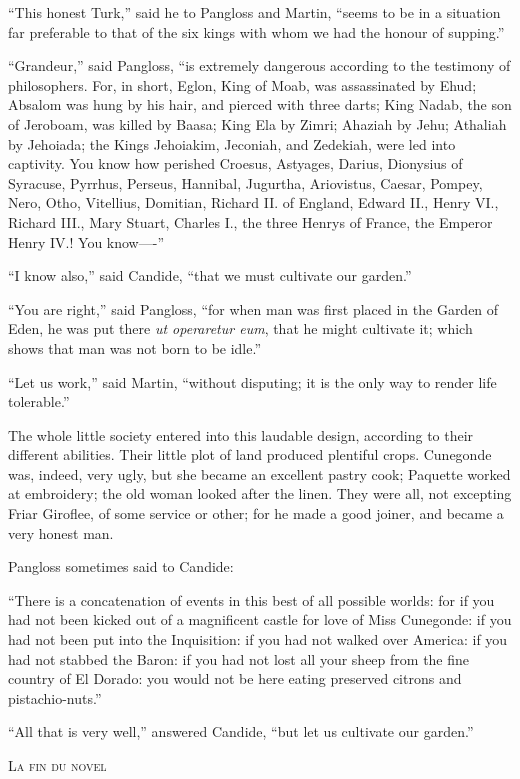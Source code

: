 ``This honest Turk,'' said he to Pangloss and Martin, ``seems to be in a situation far preferable to that of the six kings with whom we had the honour of supping.''

``Grandeur,'' said Pangloss, ``is extremely dangerous according to the testimony of philosophers. For, in short, Eglon, King of Moab, was assassinated by Ehud; Absalom was hung by his hair, and pierced with three darts; King Nadab, the son of Jeroboam, was killed by Baasa; King Ela by Zimri; Ahaziah by Jehu; Athaliah by Jehoiada; the Kings Jehoiakim, Jeconiah, and Zedekiah, were led into captivity. You know how perished Croesus, Astyages, Darius, Dionysius of Syracuse, Pyrrhus, Perseus, Hannibal, Jugurtha, Ariovistus, Caesar, Pompey, Nero, Otho, Vitellius, Domitian, Richard II. of England, Edward II., Henry VI., Richard III., Mary Stuart, Charles I., the three Henrys of France, the Emperor Henry IV.! You know----''

``I know also,'' said Candide, ``that we must cultivate our garden.''

``You are right,'' said Pangloss, ``for when man was first placed in the Garden of Eden, he was put there \textit{ut operaretur eum}, that he might cultivate it; which shows that man was not born to be idle.''

``Let us work,'' said Martin, ``without disputing; it is the only way to render life tolerable.''

The whole little society entered into this laudable design, according to their different abilities. Their little plot of land produced plentiful crops. Cunegonde was, indeed, very ugly, but she became an excellent pastry cook; Paquette worked at embroidery; the old woman looked after the linen. They were all, not excepting Friar Giroflee, of some service or other; for he made a good joiner, and became a very honest man.

Pangloss sometimes said to Candide:

``There is a concatenation of events in this best of all possible worlds: for if you had not been kicked out of a magnificent castle for love of Miss Cunegonde: if you had not been put into the Inquisition: if you had not walked over America: if you had not stabbed the Baron: if you had not lost all your sheep from the fine country of El Dorado: you would not be here eating preserved citrons and pistachio-nuts.''

``All that is very well,'' answered Candide, ``but let us cultivate our garden.''

\begin{center}
\vspace{1cm}
\textsc{La fin du novel}	
\end{center}
